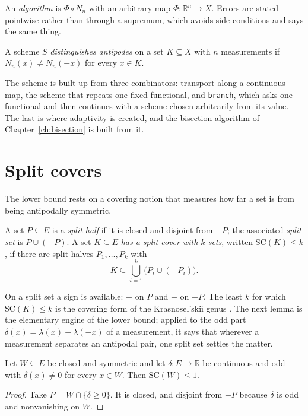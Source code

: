 An \emph{algorithm} is $\Phi \circ N_n$ with an arbitrary map
$\Phi : \mathbb{R}^n \to X$. Errors are stated pointwise rather than through a
supremum, which avoids side conditions and says the same thing.

\begin{definition}
\label{def:distinguishes-antipodes}
\leanok
{}
A scheme $S$ \emph{distinguishes antipodes} on a set $K \subseteq X$ with $n$
measurements if $N_n(x) \neq N_n(-x)$ for every $x \in K$.
\end{definition}

The scheme is built up from three combinators: transport along a continuous map, the
scheme that repeats one fixed functional, and \texttt{branch}, which asks one
functional and then continues with a scheme chosen arbitrarily from its value. The
last is where adaptivity is created, and the bisection algorithm of
Chapter~\ref{ch:bisection} is built from it.

\chapter{Split covers}
\label{ch:split}

The lower bound rests on a covering notion that measures how far a set is from being
antipodally symmetric.

\begin{definition}
\label{def:split-cover}
\leanok
A set $P \subseteq E$ is a \emph{split half} if it is closed and disjoint from $-P$;
the associated \emph{split set} is $P \cup (-P)$. A set $K \subseteq E$
\emph{has a split cover with $k$ sets}, written $\mathrm{SC}(K) \le k$, if there are
split halves $P_1, \dots, P_k$ with
\[
  K \subseteq \bigcup_{i=1}^{k} \bigl( P_i \cup (-P_i) \bigr).
\]
\end{definition}

On a split set a sign is available: $+$ on $P$ and $-$ on $-P$. The least $k$ for which
$\mathrm{SC}(K) \le k$ is the covering form of the Krasnosel'ski\u{\i} genus
\cite{Kras}. The next lemma is the elementary engine of the lower bound; applied to the
odd part
$\delta(x) = \lambda(x) - \lambda(-x)$ of a measurement, it says that wherever a
measurement separates an antipodal pair, one split set settles the matter.

\begin{lemma}
\label{lem:split-cover-odd}
\leanok
{}
Let $W \subseteq E$ be closed and symmetric and let $\delta : E \to \mathbb{R}$ be
continuous and odd with $\delta(x) \neq 0$ for every $x \in W$. Then
$\mathrm{SC}(W) \le 1$.
\end{lemma}
\begin{proof}
\leanok
Take $P = W \cap \{\delta \ge 0\}$. It is closed, and disjoint from $-P$ because
$\delta$ is odd and nonvanishing on $W$.
\end{proof}

